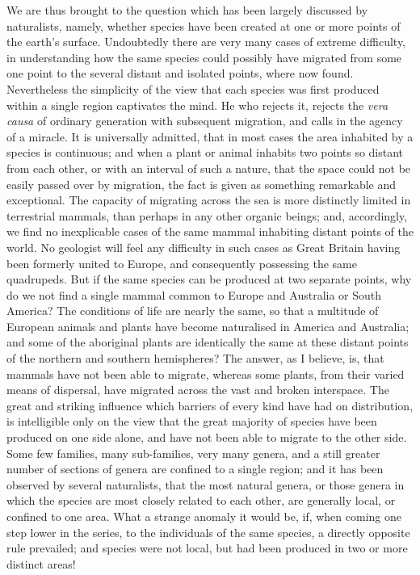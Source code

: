 \indent We are thus brought to the question which has been largely discussed by naturalists, namely, whether species have been created at one or more points of the earth's surface. Undoubtedly there are very many cases of extreme difficulty, in understanding how the same species could possibly have migrated from some one point to the several distant and isolated points, where now found. Nevertheless the simplicity of the view that each species was first produced within a single region captivates the mind. He who rejects it, rejects the \emph{vera causa} of ordinary generation with subsequent migration, and calls in the agency of a miracle. It is universally admitted, that in most cases the area inhabited by a species is continuous; and when a plant or animal inhabits two points so distant from each other, or with an interval of such a nature, that the space could not be easily passed over by migration, the fact is given as something remarkable and exceptional. The capacity of migrating across the sea is more distinctly limited in terrestrial mammals, than perhaps in any other organic beings; and, accordingly, we find no inexplicable cases of the same mammal inhabiting distant points of the world. No geologist will feel any difficulty in such cases as Great Britain having been formerly united to Europe, and consequently possessing the same quadrupeds. But if the same species can be produced at two separate points, why do we not find a single mammal common to Europe and Australia or South America? The conditions of life are nearly the same, so that a multitude of European animals and plants have become naturalised in America and Australia; and some of the aboriginal plants are identically the same at these distant points of the northern and southern hemispheres? The answer, as I believe, is, that mammals have not been able to migrate, whereas some plants, from their varied means of dispersal, have migrated across the vast and broken interspace. The great and striking influence which barriers of every kind have had on distribution, is intelligible only on the view that the great majority of species have been produced on one side alone, and have not been able to migrate to the other side.  Some few families, many sub-families, very many genera, and a still greater number of sections of genera are confined to a single region; and it has been observed by several naturalists, that the most natural genera, or those genera in which the species are most closely related to each other, are generally local, or confined to one area. What a strange anomaly it would be, if, when coming one step lower in the series, to the individuals of the same species, a directly opposite rule prevailed; and species were not local, but had been produced in two or more distinct areas!~\\
